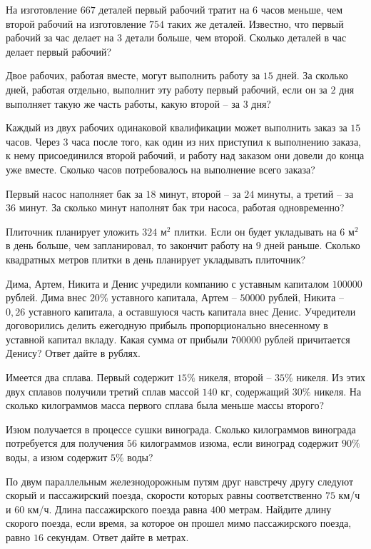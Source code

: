 \begin{listofex}
	\item На изготовление \(667\) деталей первый рабочий тратит на \( 6 \) часов меньше, чем второй рабочий на изготовление \(754\) таких же деталей. Известно, что первый рабочий за час делает на \(3\) детали больше, чем второй. Сколько деталей в час делает первый рабочий?
	\item Двое рабочих, работая вместе, могут выполнить работу за \( 15 \) дней. За сколько дней, работая отдельно, выполнит эту работу первый  рабочий, если он за \(  2 \) дня выполняет такую же часть работы, какую второй – за \( 3 \) дня?
	\item Каждый из двух рабочих одинаковой квалификации может выполнить заказ за \( 15 \) часов. Через \( 3 \) часа после того, как один из них приступил к выполнению заказа, к нему присоединился второй рабочий, и работу над заказом они довели до конца уже вместе. Сколько часов потребовалось на выполнение всего заказа?
	\item Первый насос наполняет бак за \( 18 \) минут, второй – за \( 24 \) минуты, а третий – за \( 36 \) минут. За сколько минут наполнят бак три насоса, работая одновременно?
	\item  Плиточник планирует уложить \( 324 \) м\( ^2\) плитки. Если он будет укладывать на \( 6 \) м\( ^2 \) в день больше, чем запланировал, то закончит работу на \( 9 \) дней раньше. Сколько квадратных метров плитки в день планирует укладывать плиточник?
	\item Дима, Артем, Никита и Денис учредили компанию с уставным капиталом \( 100000 \) рублей. Дима внес \( 20\% \) уставного капитала, Артем –  \( 50000 \) рублей, Никита – \( 0,26 \) уставного капитала, а оставшуюся часть капитала внес Денис. Учредители договорились делить ежегодную прибыль пропорционально внесенному в уставной капитал вкладу. Какая сумма от прибыли \( 700000 \) рублей причитается Денису? Ответ дайте в рублях.
	\item Имеется два сплава. Первый содержит \( 15\% \) никеля, второй – \( 35\% \) никеля. Из этих двух сплавов получили третий сплав массой \( 140 \) кг, содержащий \( 30\%  \) никеля. На сколько килограммов масса первого сплава была меньше массы второго?
	\item Изюм получается в процессе сушки винограда. Сколько килограммов винограда потребуется для получения \( 56 \) килограммов изюма, если виноград содержит \( 90\% \) воды, а изюм содержит \( 5\% \) воды?
	\item По двум параллельным железнодорожным путям друг навстречу другу следуют скорый и пассажирский поезда, скорости которых равны соответственно \( 75  \) км/ч и \( 60  \) км/ч. Длина пассажирского поезда равна \( 400  \) метрам. Найдите длину скорого поезда, если время, за которое он прошел мимо пассажирского поезда, равно \( 16  \) секундам. Ответ дайте в метрах.
\end{listofex}
